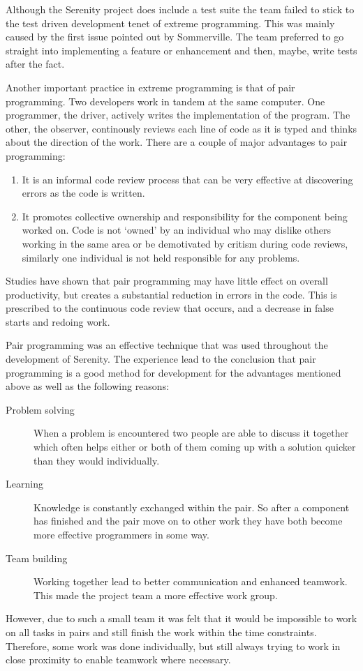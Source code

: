 Although the Serenity project does include a test suite the team failed to stick to the test
driven development tenet of extreme programming. This was mainly caused by the first issue
pointed out by Sommerville. The team preferred to go straight into implementing a feature or
enhancement and then, maybe, write tests after the fact.

Another important practice in extreme programming is that of pair programming. Two developers
work in tandem at the same computer. One programmer, the driver, actively writes the implementation
of the program. The other, the observer, continously reviews each line of code as it is typed 
and thinks about the direction of the work.\cite{williams2001} There are a couple of major advantages
to pair programming:

\begin{enumerate}
\item It is an informal code review process that can be very effective at discovering errors
      as the code is written.

\item It promotes collective ownership and responsibility for the component being worked on.
      Code is not `owned' by an individual who may dislike others working in the same area or
      be demotivated by critism during code reviews, similarly one individual is not held responsible
      for any problems.
\end{enumerate}

Studies have shown that pair programming may have little effect on overall productivity, but
creates a substantial reduction in errors in the code.\cite{cockburn2000} This is prescribed
to the continuous code review that occurs, and a decrease in false starts and redoing work.

Pair programming was an effective technique that was used throughout the development of
Serenity. The experience lead to the conclusion that pair programming is a good method for
development for the advantages mentioned above as well as the following reasons:

\begin{description}
\item[Problem solving] When a problem is encountered two people are able to discuss it together
which often helps either or both of them coming up with a solution quicker than they would
individually.

\item[Learning] Knowledge is constantly exchanged within the pair. So after a component
has finished and the pair move on to other work they have both become more effective programmers
in some way.

\item[Team building] Working together lead to better communication and enhanced teamwork.
This made the project team a more effective work group.
\end{description}

However, due to such a small team it was felt that it would be impossible to work on all
tasks in pairs and still finish the work within the time constraints. Therefore, some work
was done individually, but still always trying to work in close proximity to enable teamwork
where necessary.
